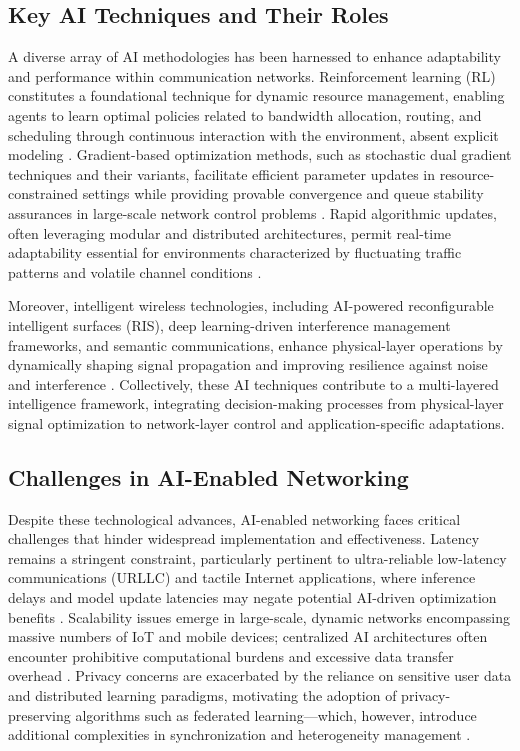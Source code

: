 \subsection{Key AI Techniques and Their Roles}

A diverse array of AI methodologies has been harnessed to enhance adaptability and performance within communication networks. Reinforcement learning (RL) constitutes a foundational technique for dynamic resource management, enabling agents to learn optimal policies related to bandwidth allocation, routing, and scheduling through continuous interaction with the environment, absent explicit modeling \cite{ref11,ref12}. Gradient-based optimization methods, such as stochastic dual gradient techniques and their variants, facilitate efficient parameter updates in resource-constrained settings while providing provable convergence and queue stability assurances in large-scale network control problems \cite{ref13,ref14}. Rapid algorithmic updates, often leveraging modular and distributed architectures, permit real-time adaptability essential for environments characterized by fluctuating traffic patterns and volatile channel conditions \cite{ref15}. 

Moreover, intelligent wireless technologies, including AI-powered reconfigurable intelligent surfaces (RIS), deep learning-driven interference management frameworks, and semantic communications, enhance physical-layer operations by dynamically shaping signal propagation and improving resilience against noise and interference \cite{ref16,ref49,ref50}. Collectively, these AI techniques contribute to a multi-layered intelligence framework, integrating decision-making processes from physical-layer signal optimization to network-layer control and application-specific adaptations.

\subsection{Challenges in AI-Enabled Networking}

Despite these technological advances, AI-enabled networking faces critical challenges that hinder widespread implementation and effectiveness. Latency remains a stringent constraint, particularly pertinent to ultra-reliable low-latency communications (URLLC) and tactile Internet applications, where inference delays and model update latencies may negate potential AI-driven optimization benefits \cite{ref26,ref27}. Scalability issues emerge in large-scale, dynamic networks encompassing massive numbers of IoT and mobile devices; centralized AI architectures often encounter prohibitive computational burdens and excessive data transfer overhead \cite{ref28}. Privacy concerns are exacerbated by the reliance on sensitive user data and distributed learning paradigms, motivating the adoption of privacy-preserving algorithms such as federated learning—which, however, introduce additional complexities in synchronization and heterogeneity management \cite{ref29,ref52}. 

